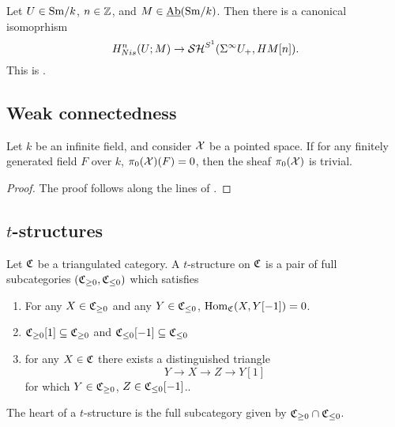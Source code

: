 \documentclass{amsart}%
\begin{document}
\begin{proposition}
  Let $U \in \mathrm{Sm}/k$, $n\in \mathbb{Z}$, and $M \in \operatorname{\underline{Ab}}(\mathrm{Sm}/k)$. Then there
  is a canonical isomoprhism
  \begin{equation*}
    H^n_{Nis}(U; M) \to \mathcal{SH}^{S^1}(\Sigma^{\infty}U_+, HM[n]).
  \end{equation*}
  This is \cite[Lemma 3.2.3]{Mor05}.
\end{proposition}


\subsection{Weak connectedness}

\begin{proposition}
  Let $k$ be an infinite field, and consider $\mathcal{X}$ be a pointed
  space. If for any finitely generated field $F$ over $k$,
  $\pi_0(\mathcal{X})(F) = 0$, then the sheaf $\pi_0(\mathcal{X})$ is trivial.
\end{proposition}
\begin{proof}
  The proof follows along the lines of \cite[Lemma 6.1.3]{Mor05}.
\end{proof}


\subsection{$t$-structures}

\begin{definition}
  Let $\mathfrak{C}$ be a triangulated category. A $t$-structure on $\mathfrak{C}$
  is a pair of full subcategories $(\mathfrak{C}_{\geq 0}, \mathfrak{C}_{\leq 0})$
  which satisfies 
  \begin{enumerate}
      \item For any $X \in \mathfrak{C}_{\geq 0}$ and any
    $ Y \in \mathfrak{C}_{\leq 0}$, $\operatorname{Hom}_{\mathfrak{C}}(X, Y[-1])=0$.
      \item $\mathfrak{C}_{\geq 0}[1] \subseteq \mathfrak{C}_{\geq 0}$ and
    $\mathfrak{C}_{\leq 0}[-1] \subseteq \mathfrak{C}_{\leq 0}$

      \item for any $X \in \mathfrak{C}$ there exists a distinguished triangle 
    \begin{equation*}
      Y \to X \to Z \to Y[1]
    \end{equation*}
    for which $Y \in \mathfrak{C}_{\geq 0}$, $Z\in \mathfrak{C}_{\leq 0}[-1]$..
  \end{enumerate}

  The heart of a $t$-structure is the full subcategory given by
  $\mathfrak{C}_{\geq 0} \cap \mathfrak{C}_{\leq 0}$. 
\end{definition}
\end{document}
